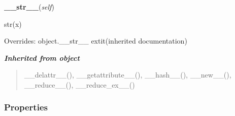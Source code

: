     \vspace{0.5ex}

\hspace{.8\funcindent}\begin{boxedminipage}{\funcwidth}

    \raggedright \textbf{\_\_str\_\_}(\textit{self})

\setlength{\parskip}{2ex}
    str(x)

\setlength{\parskip}{1ex}
      Overrides: object.\_\_str\_\_ 	extit{(inherited documentation)}

    \end{boxedminipage}


\large{\textbf{\textit{Inherited from object}}}

\begin{quote}
\_\_delattr\_\_(), \_\_getattribute\_\_(), \_\_hash\_\_(), \_\_new\_\_(), \_\_reduce\_\_(), \_\_reduce\_ex\_\_()
\end{quote}


  \subsubsection{Properties}

